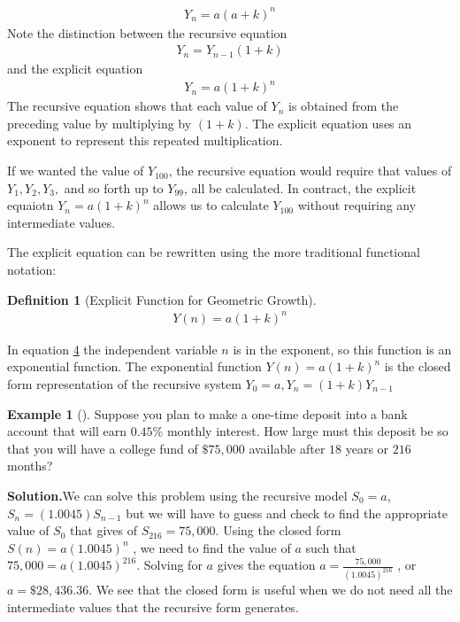 \documentclass[10pt,]{book}
\theoremstyle{plain}
\theoremstyle{definition}
\newtheorem{definition}[theorem]{Definition}
\theoremstyle{definition}
\newtheorem{example}[theorem]{Example}
\theoremstyle{definition}
\numberwithin{equation}{section}
\begin{document}
%
\begin{gather*}
Y_n=a(a+k)^n
\end{gather*}
Note the distinction between the recursive equation%
%
\begin{gather*}
Y_n=Y_{n-1}(1+k)
\end{gather*}
and the explicit equation%
%
\begin{gather*}
Y_n=a(1+k)^n
\end{gather*}
The recursive equation shows that each value of \(Y_n\)  is obtained from the preceding value by multiplying by \((1+k)\). The explicit equation uses an exponent to represent this repeated multiplication.%
\par
If we wanted the value of \(Y_{100}\), the recursive equation would require that values of \(Y_1, Y_2, Y_3,\) and so forth up to \(Y_{99}\),  all be calculated. In contract, the explicit equaiotn \(Y_n=a(1+k)^n\) allows us to calculate \(Y_{100}\) without requiring any intermediate values.%
\par
The explicit equation can be rewritten using the more traditional functional notation:%
\begin{definition}[{Explicit Function for Geometric Growth}]\label{explicit-geometric-growth-equation}
%
\begin{gather*}
Y(n)=a(1+k)^n
\end{gather*}
\end{definition}
In equation \hyperref[explicit-geometric-growth-equation]{4} the independent variable \(n\) is in the exponent, so this function is an exponential function. The exponential function \(Y(n)=a(1+k)^n\) is the closed form representation of the recursive system  \(Y_0=a,Y_n=(1+k)Y_{n-1}\)%
\begin{example}[]\label{example-one-time-bank-desposit}
Suppose you plan to make a one-time deposit into a bank account that will earn \(0.45\%\) monthly interest.  How large must this deposit be so that you will have a college fund of \(\$75,000\) available after \(18\) years or \(216\) months?%
\par\medskip\noindent%
\textbf{Solution.}\quad We can solve this problem using the recursive model \(S_0 = a\), \(S_n = (1.0045) S_{n-1}\) but we will have to guess and check to find the appropriate value of \(S_0\) that gives of \(S_{216} = 75,000\).  Using the closed form \(S(n)=a(1.0045)^n\) , we need to find the value of \(a\) such that \(75,000 = a (1.0045)^{216}\).  Solving for \(a\) gives the equation \(a = \frac{75,000}{(1.0045)^{216}}\) , or \(a = \$28,436.36\).  We see that the closed form is useful when we do not need all the intermediate values that the recursive form generates.%
\end{example}
\end{document}
